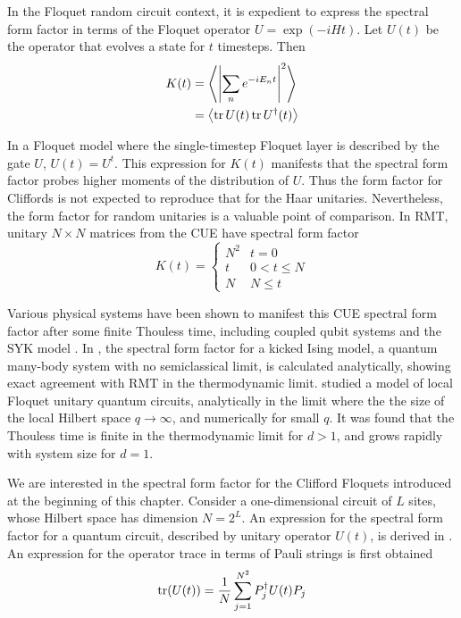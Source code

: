 \documentclass[10pt]{article}
\begin{document}
In the Floquet random circuit context, it is expedient to express the spectral form factor in terms of the Floquet operator $U = \exp\left(-iHt\right)$. Let $U(t)$ be the operator that evolves a state for $t$ timesteps. Then
\begin{align}
K(t) 
&= \ev{ \left| \sum_{n} e^{-i E_n t} \right|^2 } \\
&= \ev{ \trace{U(t)} \trace{U^\dagger(t)} }
\end{align}

In a Floquet model where the single-timestep Floquet layer is described by the gate $U$, $U(t)= U^t$. This expression for $K(t)$ manifests that the spectral form factor probes higher moments of the distribution of $U$. Thus the form factor for Cliffords is not expected to reproduce that for the Haar unitaries. Nevertheless, the form factor for random unitaries is a valuable point of comparison. In RMT, unitary $N \times N$ matrices from the CUE have spectral form factor \cite{mehta2004random}
\begin{equation}
K(t) = 
\begin{cases}
N^2 & t=0 \\ 
t 	& 0 < t \leq N \\ 
N 	& N \leq t
\end{cases}
\label{eq_cuesff}
\end{equation}

Various physical systems have been shown to manifest this CUE spectral form factor after some finite Thouless time, including coupled qubit systems and the SYK model \cite{gharibyan2018onset, chan2018solution, chan2018spectral}. In \cite{bertini2018exact}, the spectral form factor for a kicked Ising model, a quantum many-body system with no semiclassical limit, is calculated analytically, showing exact agreement with RMT in the thermodynamic limit. \cite{chan2018solution} studied a model of local Floquet unitary quantum circuits, analytically in the limit where the the size of the local Hilbert space $q\rightarrow\infty$, and numerically for small $q$. It was found that the Thouless time is finite in the thermodynamic limit for $d>1$, and grows rapidly with system size for $d=1$. 

We are interested in the spectral form factor for the Clifford Floquets introduced at the beginning of this chapter. Consider a one-dimensional circuit of $L$ sites, whose Hilbert space has dimension $N=2^L$. An expression for the spectral form factor for a quantum circuit, described by unitary operator $U(t)$, is derived in \cite{gharibyan2018onset}. An expression for the operator trace in terms of Pauli strings is first obtained
\begin{equation}
\trace(U(t)) = \frac{1}{N} \sum_{j=1}^{N^2} P^\dagger_{j} U(t) P_j
\end{equation}
\end{document}
